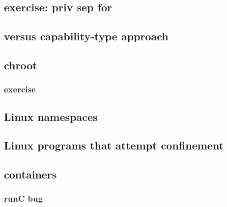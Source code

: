 \subsection{exercise: priv sep for}



\subsection{versus capability-type approach}


\subsection{chroot}


\subsubsection{exercise}


\subsection{Linux namespaces}




\subsection{Linux programs that attempt confinement}


\subsection{containers}



\subsubsection{runC bug}



